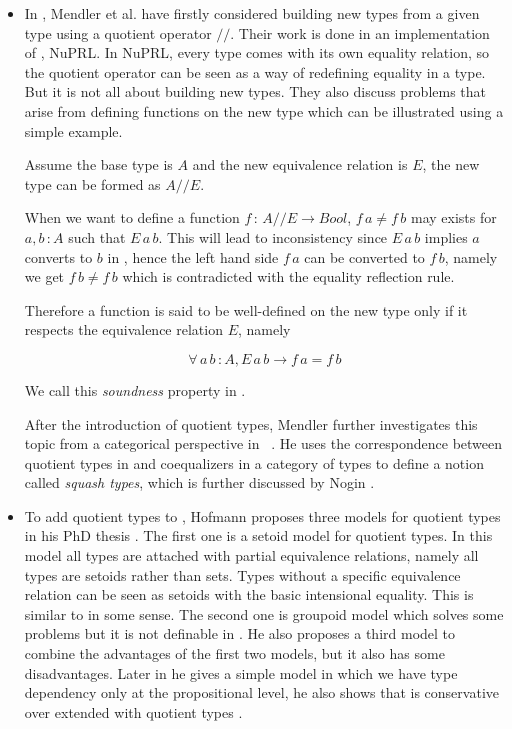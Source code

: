 \begin{itemize}

\item In \cite{cab}, Mendler et al. have firstly considered building new types from a
given type using a quotient operator $//$. Their work is done in an
implementation of \ett, NuPRL. 
In NuPRL, every type comes with its own equality relation, so the quotient operator can be
seen as a way of redefining equality in a type. But it is not all
about building new types. They also discuss problems that arise from
defining functions on the new type which can be illustrated using a simple example. 

Assume the base type is $A$ and the new equivalence relation is $E$, the new
type can be formed as $A//E$. 

When we want to define a function $f \,\colon\, A//E \to Bool$,  $f\,a \not= f\,b$ may
exists for $a, b \,\colon A$ such that $E\,a\,b$. This will lead to
inconsistency since $E\,a\,b$ implies $a$ converts to $b$ in \ett{}, hence
the left hand side $f\,a$ can be converted to $f\,b$, namely we get $f\,b \not= f\,b$
which is contradicted with the equality reflection rule. 

Therefore a function is said to be well-defined \cite{cab} on the new type only
if it respects the equivalence relation $E$, namely

$$\forall \, a\,b\,\colon A, E\,a\,b \to f\,a = f\,b$$

We call this \emph{soundness} property in \cite{aan}.

 After the introduction of quotient types, Mendler further investigates
 this topic from a categorical perspective in ~\cite{men:90}. He uses
 the correspondence between quotient types in \mltt{} and coequalizers
 in a category of types to define a notion called \emph{squash types},
 which is further discussed by Nogin \cite{nog:02}.

\item To add quotient types to \mltt, Hofmann proposes three models for
quotient types in his PhD thesis \cite{hof:phd}. The first one is a setoid model for
quotient types. In this model all types are attached with partial
equivalence relations, namely all types are setoids rather than
sets. Types without a specific equivalence relation can be seen as
setoids with the basic intensional equality. This is similar to
\ett in some sense. The second one is groupoid model which solves some problems
but it is not definable in \itt. He also proposes a third model to
combine the advantages of the first two models, but it also has some
disadvantages. Later in \cite{hof:95:sm} he gives a simple model in which we have type dependency only at the propositional level, he also shows that \ett is conservative over \itt extended with quotient types \cite{hof:95:con}.


\end{itemize}
